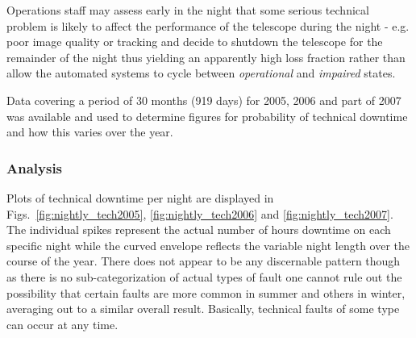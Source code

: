 Operations staff may assess early in the night that some serious technical problem is likely to affect the performance of the telescope during the night - e.g. poor image quality or tracking and decide to shutdown the telescope for the remainder of the night thus yielding an apparently high loss fraction rather than allow the automated systems to cycle between \emph{operational} and \emph{impaired} states.

Data covering a period of 30 months (919 days) for 2005, 2006 and part of 2007 was available and used to determine figures for probability of technical downtime and how this varies over the year. 

\subsubsection{Analysis}

Plots of technical downtime per night are displayed in Figs.~\ref{fig:nightly_tech2005}, \ref{fig:nightly_tech2006} and \ref{fig:nightly_tech2007}. The individual spikes represent the actual number of hours downtime on each specific night while the curved envelope reflects the variable night length over the course of the year. There does not appear to be any discernable pattern though as there is no sub-categorization of actual types of fault one cannot rule out the possibility that certain faults are more common in summer and others in winter, averaging out to a similar overall result. Basically, technical faults of some type can occur at any time.

